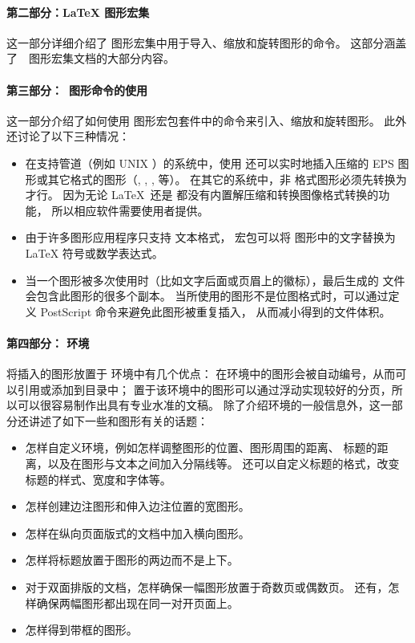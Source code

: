 \paragraph{第二部分：\LaTeX{} 图形宏集}
这一部分详细介绍了 \LaTeXe{} 图形宏集中用于导入、缩放和旋转图形的命令。
这部分涵盖了~\LaTeXe{}~图形宏集文档的大部分内容\cite{grfguide}。

\paragraph{第三部分：\LaTeXe{}~图形命令的使用}
这一部分介绍了如何使用 \LaTeXe{} 图形宏包套件中的命令来引入、缩放和旋转图形。
此外还讨论了以下三种情况：
\begin{itemize}
	\item 在支持管道（例如 UNIX ）的系统中，使用  还可以实时地插入压缩的 EPS 图形或其它格式的图形（, , ,  等）。
	在其它的系统中，非  格式图形必须先转换为  才行。
	因为无论 \LaTeX\ 还是  都没有内置解压缩和转换图像格式转换的功能，
	所以相应软件需要使用者提供。
	\item 由于许多图形应用程序只支持 \ascii 文本格式，
	 宏包可以将  图形中的文字替换为 \LaTeX{} 符号或数学表达式。
	\item 当一个图形被多次使用时（比如文字后面或页眉上的徽标），最后生成的  文件会包含此图形的很多个副本。
	当所使用的图形不是位图格式时，可以通过定义 PostScript 命令来避免此图形被重复插入，
	从而减小得到的文件体积。
\end{itemize}

\paragraph{第四部分： 环境}
将插入的图形放置于 环境中有几个优点：
在环境中的图形会被自动编号，从而可以引用或添加到目录中；
置于该环境中的图形可以通过浮动实现较好的分页，所以可以很容易制作出具有专业水准的文稿。
除了介绍环境的一般信息外，这一部分还讲述了如下一些和图形有关的话题：
\begin{itemize}
	\item 怎样自定义环境，例如怎样调整图形的位置、图形周围的距离、
	标题的距离，以及在图形与文本之间加入分隔线等。
	还可以自定义标题的格式，改变标题的样式、宽度和字体等。
	\item 怎样创建边注图形和伸入边注位置的宽图形。
	\item 怎样在纵向页面版式的文档中加入横向图形。
	\item 怎样将标题放置于图形的两边而不是上下。
	\item 对于双面排版的文档，怎样确保一幅图形放置于奇数页或偶数页。
	还有，怎样确保两幅图形都出现在同一对开页面上。
	\item 怎样得到带框的图形。
\end{itemize}


